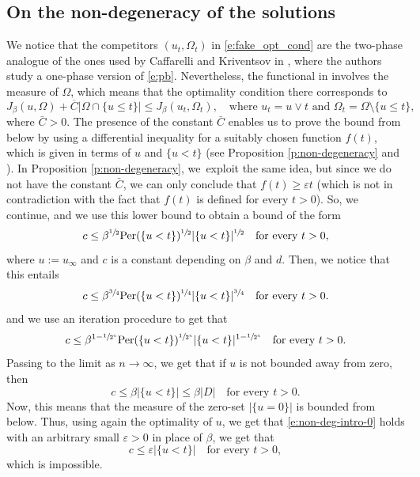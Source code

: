 \documentclass[11pt]{article}
\numberwithin{equation}{section}
\newcommand{\Per}{\mathrm{Per}}
\theoremstyle{plain}
\theoremstyle{definition}
\let\eps\varepsilon
\begin{document}
\subsection{On the non-degeneracy of the solutions}
We notice that the competitors $(u_t,\Omega_t)$ in \eqref{e:fake_opt_cond} are the two-phase analogue of the ones used by Caffarelli and Kriventsov in \cite{ck}, where the authors study a one-phase version of \eqref{e:pb}. Nevertheless, the functional in \cite{ck} involves the measure of $\Omega$, which means that the optimality condition there corresponds to
\begin{equation*}
J_\beta(u,\Omega)+\overline C|\Omega\cap\{u\le t\}|\le J_\beta(u_t,\Omega_t),\quad\text{where } u_t=u\vee t\text{ and } \Omega_t=\Omega\setminus \{u\le t\},
\end{equation*}
where $\bar C>0$. The presence of the constant $\bar C$ enables us to prove the bound from below by using a differential inequality for a suitably chosen function $f(t)$, which is given in terms of $u$ and $\{u<t\}$ (see Proposition \ref{p:non-degeneracy} and \cite[Th.\,3.2]{ck}). In Proposition \ref{p:non-degeneracy}, we~exploit the same idea, but since we do not have the constant $\bar C$, we can only conclude that $f(t)\ge \eps t$ (which is not in contradiction with the fact that $f(t)$ is defined for every $t>0$). So, we continue, and we use this lower bound to obtain a bound of the form
\begin{equation}\label{e:non-deg-intro-0}
c\le \beta^{\sfrac12}\Per(\{u<t\})^{\sfrac12}|\{u<t\}|^{\sfrac12}\quad\text{for every } t>0,
\end{equation}
where $u:=u_\infty$ and $c$ is a constant depending on $\beta$ and $d$. Then, we notice that this entails
\[c\le \beta^{\sfrac34}\Per(\{u<t\})^{\sfrac14}|\{u<t\}|^{\sfrac34}\quad\text{for every } t>0.\]
and we use an iteration procedure to get that
\[c\le \beta^{1-\sfrac1{2^n}}\Per(\{u<t\})^{\sfrac1{2^n}}|\{u<t\}|^{1-\sfrac1{2^n}}\quad\text{for every } t>0.\]
Passing to the limit as $n\to\infty$, we get that if $u$ is not bounded away from zero, then
\begin{equation}\label{e:non-deg-intro}
c\le \beta |\{u<t\}|\le\beta |D|\quad\text{for every } t>0.
\end{equation}
Now, this means that the measure of the zero-set $|\{u=0\}|$ is bounded from below. Thus, using again the optimality of $u$, we get that \eqref{e:non-deg-intro-0} holds with an arbitrary small $\eps>0$ in place of $\beta$, we get that
\begin{equation*}
c\le \eps |\{u<t\}|\quad\text{for every } t>0,
\end{equation*}
which is impossible.
\end{document}
